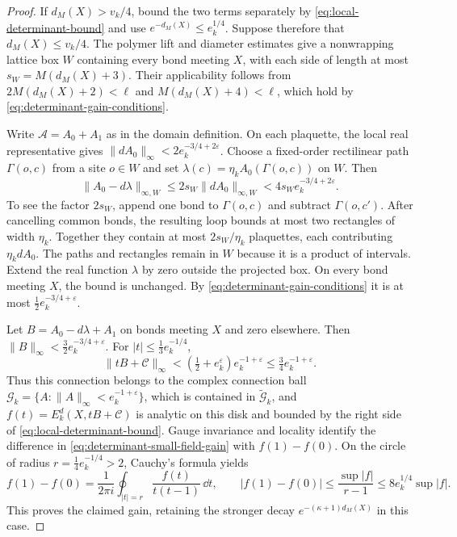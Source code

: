 \begin{proof}
If $d_M(X)>v_k/4$, bound the two terms separately by
\eqref{eq:local-determinant-bound} and use
$e^{-d_M(X)}\le e_k^{1/4}$. Suppose therefore that
$d_M(X)\le v_k/4$. The polymer lift and diameter estimates give
a nonwrapping lattice box $W$ containing every bond meeting $X$,
with each side of length at most
$s_W=M(d_M(X)+3)$.
Their applicability follows from
$2M(d_M(X)+2)<\ell$ and $M(d_M(X)+4)<\ell$, which hold by
\eqref{eq:determinant-gain-conditions}.

Write $\mathscr A=A_0+A_1$ as in the domain definition.
On each plaquette, the local real representative gives
$\|dA_0\|_\infty<2e_k^{-3/4+2\varepsilon}$.
Choose a fixed-order rectilinear path $\Gamma(o,c)$ from a site
$o\in W$ and set $\lambda(c)=\eta_k A_0(\Gamma(o,c))$ on $W$.
Then
\[
 \|A_0-d\lambda\|_{\infty,W}
             \le2s_W\|dA_0\|_{\infty,W}
             <4s_We_k^{-3/4+2\varepsilon}.
\]
To see the factor $2s_W$, append one bond to $\Gamma(o,c)$ and
subtract $\Gamma(o,c')$. After cancelling common bonds, the
resulting loop bounds at most two rectangles of width $\eta_k$.
Together they contain at most $2s_W/\eta_k$ plaquettes, each
contributing $\eta_k dA_0$. The paths and rectangles remain in
$W$ because it is a product of intervals. Extend the real function
$\lambda$ by zero outside the projected box. On every bond meeting
$X$, the bound is unchanged. By
\eqref{eq:determinant-gain-conditions} it is at most
$\tfrac12e_k^{-3/4+\varepsilon}$.

Let $B=A_0-d\lambda+A_1$ on bonds meeting $X$ and zero elsewhere.
Then $\|B\|_\infty<\tfrac32e_k^{-3/4+\varepsilon}$.
For $|t|\le\tfrac13e_k^{-1/4}$,
\[
 \|tB+\mathscr C\|_\infty
       <(\tfrac12+e_k^\varepsilon)e_k^{-1+\varepsilon}
       \le\tfrac34e_k^{-1+\varepsilon}.
\]
Thus this connection belongs to the complex connection ball
$\mathcal G_k=\{A:\|A\|_\infty<e_k^{-1+\varepsilon}\}$,
which is contained in $\widetilde{\mathcal G}_k$, and
$f(t)=E_k^d(X,tB+\mathscr C)$ is analytic on this disk and
bounded by the right side of \eqref{eq:local-determinant-bound}.
Gauge invariance and locality identify the difference in
\eqref{eq:determinant-small-field-gain} with $f(1)-f(0)$.
On the circle of radius $r=\tfrac14e_k^{-1/4}>2$, Cauchy's
formula yields
\[
 f(1)-f(0)=\frac1{2\pi i}\oint_{|t|=r}
                         \frac{f(t)}{t(t-1)}\,\dd t,
 \qquad |f(1)-f(0)|\le\frac{\sup|f|}{r-1}
                          \le8e_k^{1/4}\sup|f|.
\]
This proves the claimed gain, retaining the stronger decay
$e^{-(\kappa+1)d_M(X)}$ in this case.
\end{proof}

